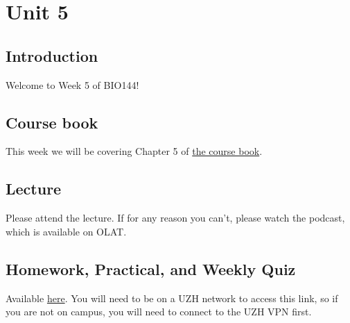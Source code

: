 \documentclass[
  letterpaper,
  8pt,
  a4paper]{book}
\begin{document}

\chapter*{Unit 5}\label{unit-5}


\section*{Introduction}\label{introduction-5}


Welcome to Week 5 of BIO144!

\section*{Course book}\label{course-book-4}


This week we will be covering Chapter 5 of
\href{https://opetchey.github.io/BIO144_Course_Book/}{the course book}.

\section*{Lecture}\label{lecture-4}


Please attend the lecture. If for any reason you can't, please watch the
podcast, which is available on OLAT.

\section*{Homework, Practical, and Weekly
Quiz}\label{homework-practical-and-weekly-quiz-4}


Available
\href{https://rstudio.mnf.uzh.ch:3939/content/550e6fb0-423a-4087-9bb2-49e9be0a86c7}{here}.
You will need to be on a UZH network to access this link, so if you are
not on campus, you will need to connect to the UZH VPN first.

\end{document}
